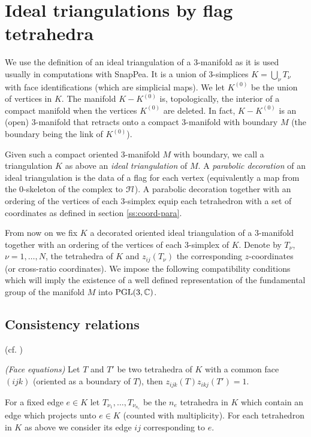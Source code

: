 \section{Ideal triangulations by flag tetrahedra}

We use the definition of an ideal triangulation of a 3-manifold as it is used usually in computations with SnapPea.
It is a union of 3-simplices $K= \bigcup_\nu T_\nu$ with face identifications (which are simplicial maps).  We let  $K^{(0)}$ be the union of vertices in
$K$.  The manifold $K- K^{(0)} $ is, topologically, the interior of a compact
manifold when the vertices $K^{(0)} $  are deleted. In fact, $K-K^{(0)}$
is an (open) $3$-manifold  that retracts onto a compact $3$-manifold with boundary $M$ (the boundary being the link of $K^{(0)}$).

Given such a compact oriented $3$-manifold $M$ with boundary, we call a triangulation $K$  as above an {\it ideal triangulation} of $M$.
A {\it parabolic decoration} of an ideal  triangulation is the data of a flag for each vertex (equivalently a map from the $0$-skeleton of the complex to $\mathcal{F}l$).
A parabolic decoration
together with an ordering of the vertices of each $3$-simplex  equip each tetrahedron with a set of coordinates as defined in section \ref{ss:coord-para}.

From now on we fix $K$ a decorated oriented ideal triangulation of a $3$-manifold together with an ordering of the vertices of each $3$-simplex of $K$. Denote by $T_{\nu}$, $\nu =1 , \ldots , N$,  the tetrahedra of $K$ and
$z_{ij}(T_{\nu})$ the corresponding $z$-coordinates (or cross-ratio coordinates).  We impose the following compatibility conditions which will imply the existence of a well defined representation
of the fundamental group of the manifold $M$ into $\textrm{PGL}(3,\mathbb{C})$.

\subsection{Consistency relations}
\label{sec-consistency}(cf. \cite{falbel,BFG})

\medskip

\emph{(Face equations)}
Let $T$ and $T'$ be two tetrahedra  of $K$ with a common face $(ijk)$ (oriented as a boundary of $T$), then $z_{ijk}(T)z_{ikj}(T')=1$.


\medskip

For a fixed edge   $e\in K$ let $T_{\nu_1}, \ldots , T_{\nu_{n_e}}$ be the $n_e$ tetrahedra in $K$ which contain an edge which projects unto  $e\in K$ (counted with multiplicity).  For each tetrahedron in $K$ as above we consider its edge $ij$ corresponding to $e$.

